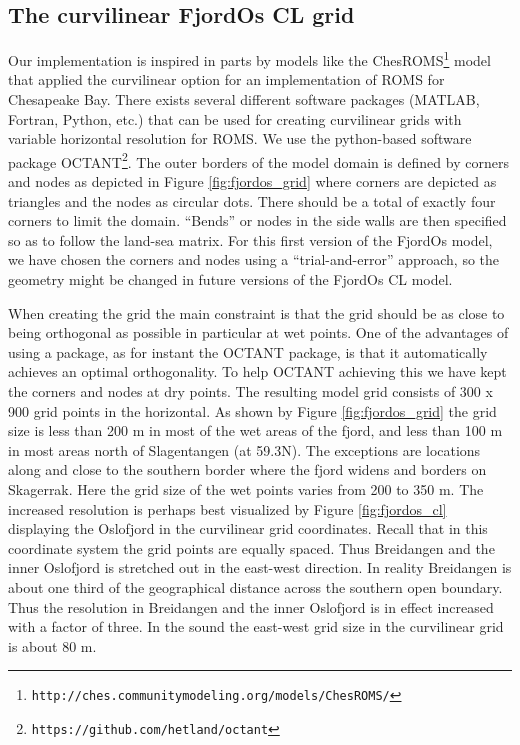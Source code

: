 \subsection{The curvilinear FjordOs CL grid}
Our implementation is inspired in parts by models like the ChesROMS\footnote{\texttt{http://ches.communitymodeling.org/models/ChesROMS/}} model that applied the curvilinear option for an implementation of ROMS for Chesapeake Bay. There exists several different software packages (MATLAB, Fortran, Python, etc.) that can be used for creating curvilinear grids with variable horizontal resolution for ROMS. We use the python-based software package OCTANT\footnote{\texttt{https://github.com/hetland/octant}}. The outer borders of the model domain is defined by corners and nodes as depicted in Figure \ref{fig:fjordos_grid} where corners are depicted as triangles and the nodes as circular dots. There should be a total of exactly four corners to limit the domain. ``Bends'' or nodes in the side walls are then specified so as to follow the land-sea matrix. For this first version of the FjordOs model, we have chosen the corners and nodes using a ``trial-and-error'' approach, so the geometry might be changed in future versions of the FjordOs CL model.


When creating the grid the main constraint is that the grid should be as close to being orthogonal as possible in particular at wet points. One of the advantages of using a package, as for instant the OCTANT package, is that it automatically achieves an optimal orthogonality. To help OCTANT achieving this we have kept the corners and nodes at dry points. The resulting model grid consists of 300 x 900 grid points in the horizontal. As shown by Figure \ref{fig:fjordos_grid} the grid size is less than 200 m in most of the wet areas of the fjord, and less than 100 m in most areas north of Slagentangen (at 59.3N). The exceptions are locations along and close to the southern border where the fjord widens and borders on Skagerrak. Here the grid size of the wet points varies from 200 to 350 m. The increased resolution is perhaps best visualized by Figure \ref{fig:fjordos_cl} displaying the Oslofjord in the curvilinear grid coordinates. Recall that in this coordinate system the grid points are equally spaced. Thus Breidangen and the inner Oslofjord is stretched out in the east-west direction. In reality Breidangen is about one third of the geographical distance across the southern open boundary. Thus the resolution in Breidangen and the inner Oslofjord is in effect increased with a factor of three. In the {\DR} sound the east-west grid size in the curvilinear grid is about 80 m.  


